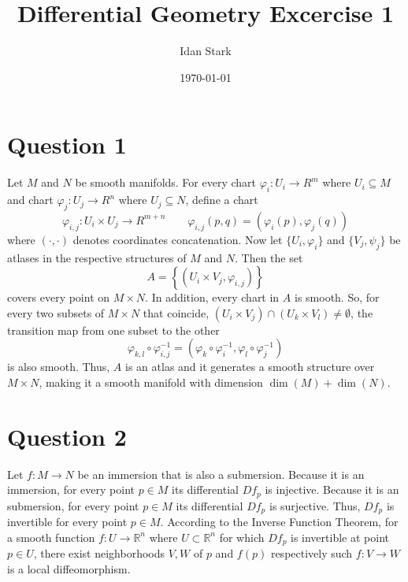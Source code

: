 \documentclass{article}
\title{Differential Geometry Excercise 1}
\author{Idan Stark}
\date{\today}
\newcommand{\R}{\ensuremath{\mathbb{R}}}
\begin{document}
\maketitle


\section*{Question 1}
Let $M$ and $N$ be smooth manifolds. For every chart $\varphi_i : U_i \rightarrow R^m$ where $U_i \subseteq M$ and chart $\varphi_j : U_j \rightarrow R^n$ where $U_j \subseteq N$, define a chart
\begin{equation}
    \varphi_{i,j}: U_i \times U_j \rightarrow R^{m+n}
    \qquad
    \varphi_{i,j}(p, q) = (\varphi_i(p), \varphi_j(q))
\end{equation}
where $ \left(\cdot,\cdot\right) $ denotes coordinates concatenation.
\newline
Now let $\{U_i, \varphi_i\}$ and $\{V_j, \psi_j\}$ be atlases in the respective structures of $M$ and $N$. Then the set
\begin{equation}
    A = \left\{\left(U_i \times V_j, \varphi_{i, j}\right)\right\}
\end{equation}
covers every point on $M \times N$. In addition, every chart in $A$ is smooth. So, for every two subsets of $M \times N$ that coincide, $(U_i \times V_j) \cap (U_k \times V_l) \ne \emptyset$, the transition map from one subset to the other
\begin{equation}
    \varphi_{k,l}\circ\varphi_{i,j}^{-1} = (\varphi_k\circ\varphi_i^{-1}, \varphi_l\circ\varphi_j^{-1})
\end{equation}
is also smooth. Thus, $A$ is an atlas and it generates a smooth structure over $M \times N$, making it a smooth manifold with dimension $\dim(M) + \dim(N)$.

\section*{Question 2}
Let $f: M \rightarrow N$ be an immersion that is also a submersion. Because it is an immersion, for every point $p \in M$ its differential $Df_p$ is injective. Because it is an submersion, for every point $p \in M$ its differential $Df_p$ is surjective. Thus, $Df_p$ is invertible for every point $p \in M$.
\newline
According to the Inverse Function Theorem, for a smooth function $f: U \rightarrow \R^n$ where $U \subset \R^n$ for which $Df_p$ is invertible at point $p \in U$, there exist neighborhoods $V, W$ of $p$ and $f(p)$ respectively such $f:V \rightarrow W$ is a local diffeomorphism.
\end{document}
